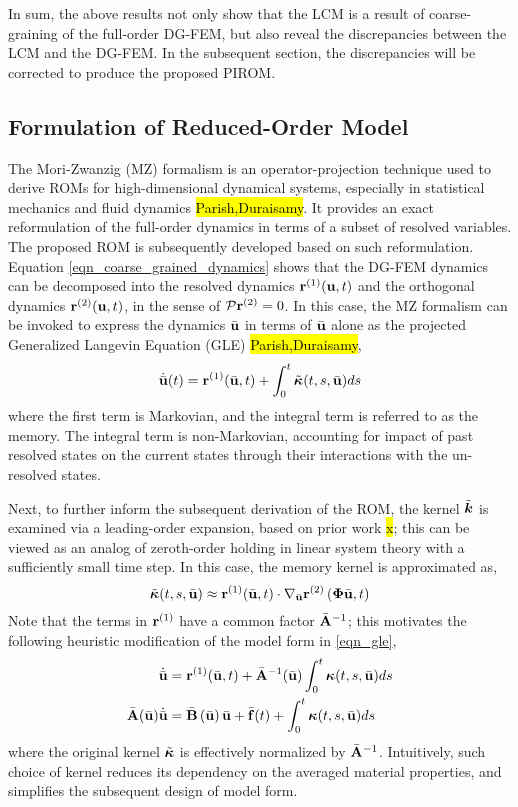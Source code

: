 In sum, the above results not only show that the LCM is a result of coarse-graining of the full-order DG-FEM, but also reveal the discrepancies between the LCM and the DG-FEM. In the subsequent section, the discrepancies will be corrected to produce the proposed PIROM.

\subsection{Formulation of Reduced-Order Model}

The Mori-Zwanzig (MZ) formalism is an operator-projection technique used to derive ROMs for high-dimensional dynamical systems, especially in statistical mechanics and fluid dynamics \hl{Parish,Duraisamy}. It provides an exact reformulation of the full-order dynamics in terms of a subset of resolved variables. The proposed ROM is subsequently developed based on such reformulation. Equation \cref{eqn_coarse_grained_dynamics} shows that the DG-FEM dynamics can be decomposed into the resolved dynamics $\mathbf{r}^{(1)}(\mathbf{u},t)$ and the orthogonal dynamics $\mathbf{r}^{(2)}(\mathbf{u},t)$, in the sense of $\mathcal{P}\mathbf{r}^{(2)}=0$. In this case, the MZ formalism can be invoked to express the dynamics $\bar{\mathbf{u}}$ in terms of $\bar{\mathbf{u}}$ alone as the projected Generalized Langevin Equation (GLE) \hl{Parish,Duraisamy},
\begin{equation}
    \dot{\bar{\mathbf{u}}}(t) = \mathbf{r}^{(1)}(\bar{\mathbf{u}},t) + \int_{0}^{t}\tilde{\boldsymbol{\kappa}}(t,s,\bar{\mathbf{u}})ds\label{eqn_gle}
\end{equation}
where the first term is Markovian, and the integral term is referred to as the memory. The integral term is non-Markovian, accounting for impact of past resolved states on the current states through their interactions with the un-resolved states.

Next, to further inform the subsequent derivation of the ROM, the kernel $\tilde{\boldsymbol{k}}$ is examined via a leading-order expansion, based on prior work \hl{x}; this can be viewed as an analog of zeroth-order holding in linear system theory with a sufficiently small time step. In this case, the memory kernel is approximated as,
\begin{equation}
    \tilde{\boldsymbol{\kappa}}(t,s,\bar{\mathbf{u}}) \approx \mathbf{r}^{(1)}(\bar{\mathbf{u}},t) \cdot \nabla_{\bar{\mathbf{u}}}\mathbf{r}^{(2)}\left(\boldsymbol{\Phi}\bar{\mathbf{u}},t\right)
\end{equation}
Note that the terms in $\mathbf{r}^{(1)}$ have a common factor $\bar{\mathbf{A}}^{-1}$; this motivates the following heuristic modification of the model form in \cref{eqn_gle},
\begin{subequations}
    \begin{align}
        \dot{\bar{\mathbf{u}}} &= \mathbf{r}^{(1)}(\bar{\mathbf{u}},t) + \bar{\mathbf{A}}^{-1}(\bar{\mathbf{u}})\int_{0}^{t}\boldsymbol{\kappa}(t,s,\bar{\mathbf{u}})ds\label{eqn_pirom_gle}\\
        \bar{\mathbf{A}}(\bar{\mathbf{u}})\dot{\bar{\mathbf{u}}} &= \bar{\mathbf{B}}\left(\bar{\mathbf{u}}\right)\bar{\mathbf{u}} + \bar{\mathbf{f}}(t) + \int_{0}^{t}\boldsymbol{\kappa}(t,s,\bar{\mathbf{u}})ds\label{eqn_lcm_gle}
    \end{align}
\end{subequations}
where the original kernel $\tilde{\boldsymbol{\kappa}}$ is effectively normalized by $\bar{\mathbf{A}}^{-1}$. Intuitively, such choice of kernel reduces its dependency on the averaged material properties, and simplifies the subsequent design of model form.

